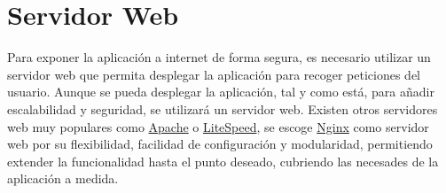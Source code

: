 \section{Servidor Web}
Para exponer la aplicación a internet de forma segura, es necesario utilizar un servidor web que permita desplegar la aplicación para recoger peticiones del usuario. Aunque se pueda desplegar la aplicación, tal y como está, para añadir escalabilidad y seguridad, se utilizará un servidor web. Existen otros servidores web muy populares como \href{https://httpd.apache.org/}{Apache} o \href{https://www.litespeedtech.com/products/litespeed-web-server}{LiteSpeed}, se escoge \href{https://nginx.org/en/}{Nginx} como servidor web por su flexibilidad, facilidad de configuración y modularidad, permitiendo extender la funcionalidad hasta el punto deseado, cubriendo las necesades de la aplicación a medida.